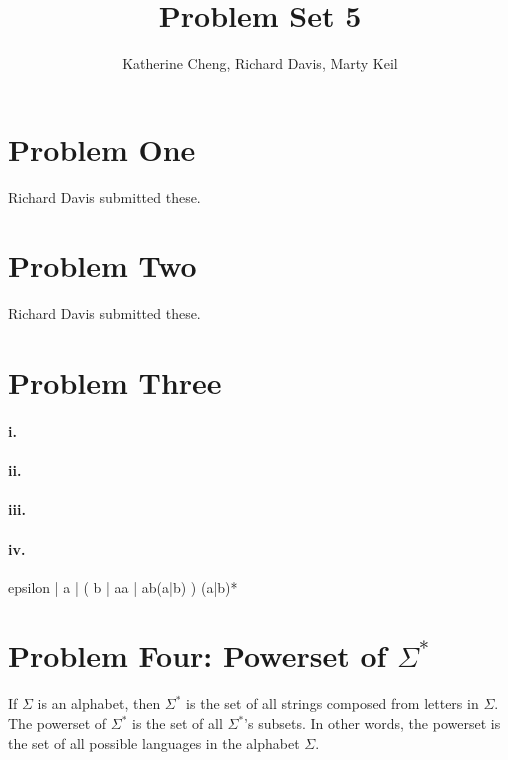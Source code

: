 \documentclass[10pt,letter]{article}
\begin{document}

\title{Problem Set 5}

\author{Katherine Cheng, Richard Davis, Marty Keil}

 
\maketitle 

\section*{Problem One} Richard Davis submitted these.

\section*{Problem Two} Richard Davis submitted these.

\section*{Problem Three} 

\paragraph{i.}
\paragraph{ii.}
\paragraph{iii.}
\paragraph{iv.} epsilon | a | ( b | aa | ab(a|b) ) (a|b)*

\section*{Problem Four: Powerset of $\Sigma^*$}
If $\Sigma$ is an alphabet, then $\Sigma^*$ is the set of all strings composed from letters in $\Sigma$. The powerset of $\Sigma^*$ is the set of all $\Sigma^*$'s subsets. In other words, the powerset is the set of all possible languages in the alphabet $\Sigma$. 
\end{document}
